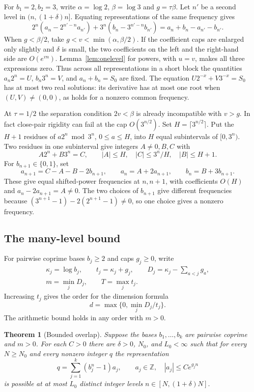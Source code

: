 \documentclass[11pt,a4paper,reqno]{amsart}
\newtheorem{theorem}{Theorem}[section]
\theoremstyle{definition}
\theoremstyle{remark}
\numberwithin{equation}{section}
\begin{document}
For \(b_1=2,b_2=3\), write \(\alpha=\log 2\), \(\beta=\log 3\)
and \(g=\tau\beta\). Let \(n'\) be a second level in
\((n,(1+\delta)n]\). Equating representations of the same frequency
gives
\[
  2^n(a_n-2^{n'-n}a_{n'})+
  3^n(b_n-3^{n'-n}b_{n'})
     =a_n+b_n-a_{n'}-b_{n'}.
\]
When \(g<\beta/2\), take \(g<v<\min(\alpha,\beta/2)\). If the
coefficient caps are enlarged only slightly and \(\delta\) is
small, the two coefficients on the left and the right-hand side
are \(O(e^{vn})\). Lemma~\ref{lem:onelevel} for powers, with
\(u=v\), makes all three expressions zero. Thus across all
representations in a short block the quantities
\(a_n2^n=U\), \(b_n3^n=V\), and \(a_n+b_n=S_0\) are fixed.
The equation \(U2^{-x}+V3^{-x}=S_0\) has at most two real
solutions: its derivative has at most one root when
\((U,V)\ne(0,0)\), as holds for a nonzero common frequency.

At \(\tau=1/2\) the separation condition \(2v<\beta\) is already
incompatible with \(v>g\). In fact close-pair rigidity can fail
at the cap \(O(3^{n/2})\). Set \(H=\lceil 3^{n/2}\rceil\).
Put the \(H+1\) residues of \(a2^n\bmod 3^n\), \(0\le a\le H\),
into \(H\) equal subintervals of \([0,3^n)\). Two residues in
one subinterval give integers \(A\ne0,B,C\) with
\[
  A2^n+B3^n=C,\qquad |A|\le H,\quad |C|\le 3^n/H,
  \quad |B|\le H+1 .
\]
For \(b_{n+1}\in\{0,1\}\), set
\[
  a_{n+1}=C-A-B-2b_{n+1},\qquad
  a_n=A+2a_{n+1},\qquad b_n=B+3b_{n+1}.
\]
These give equal shifted-power frequencies at \(n,n+1\), with
coefficients \(O(H)\) and \(a_n-2a_{n+1}=A\ne0\). The two choices
of \(b_{n+1}\) give different frequencies because
\((3^{n+1}-1)-2(2^{n+1}-1)\ne0\), so one choice gives a nonzero
frequency.

\subsection{The many-level bound}

For pairwise coprime bases \(b_j\ge2\) and caps \(g_j\ge0\), write
\[
\begin{gathered}
  \kappa_j=\log b_j,\qquad t_j=\kappa_j+g_j,\qquad
  D_j=\kappa_j-\sum_{a<j}g_a,\\
  m=\min_j D_j,\qquad T=\max_j t_j .
\end{gathered}
\]
Increasing \(t_j\) gives the order for the dimension formula
\[
                    d=\max\{0,\min_j D_j/t_j\}.
\]
The arithmetic bound holds in any order with \(m>0\).

\begin{theorem}[Bounded overlap]\label{thm:overlap}
Suppose the bases \(b_1,\ldots,b_k\) are pairwise coprime and
\(m>0\). For each \(C>0\) there are \(\delta>0\), \(N_0\), and
\(L_0<\infty\) such that for every \(N\ge N_0\) and every nonzero
integer \(q\) the representation
\[
  q=\sum_{j=1}^k (b_j^n-1)a_j,\qquad
  a_j\in\mathbb Z,\quad |a_j|\le C e^{g_j n}
\]
is possible at at most \(L_0\) distinct integer levels
\(n\in[N,(1+\delta)N]\).
\end{theorem}
\end{document}
